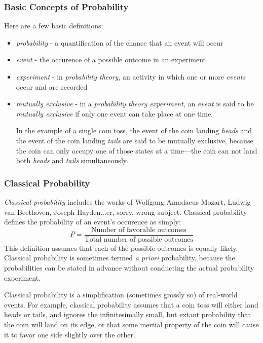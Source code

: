 \documentclass[12pt]{article}
\begin{document}
\subsubsection{Basic Concepts of Probability}
Here are a few basic definitions:
\begin{itemize}
\item \textit{probability} - a quantification of the chance that an event will occur
\item \textit{event} - the occurence of a possible outcome in an experiment
\item \textit{experiment} - in \textit{probability theory}, an activity in which one or more \textit{events} occur and are recorded
\item \textit{mutually exclusive} - in a \textit{probability theory experiment}, an \textit{event} is said to be \textit{mutually exclusive} if only one event can take place at one time. 

In the example of a single coin toss, the event of the coin landing \textit{heads} and the event of the coin landing \textit{tails} are said to be mutually exclusive, because the coin can only  occupy one of those states at a time---the coin can not land both \textit{heads} and \textit{tails} simultaneously.

\end{itemize}

\subsubsection{Classical Probability}
\textit{Classical probability} includes the works of Wolfgang Amadaeus Mozart, Ludwig van Beethoven, Joseph Hayden...er, sorry, wrong subject. Classical probability defines the probability of an event's occurence as simply:
\begin{equation}
P = \frac{\text{Number of favorable outcomes}}{\text{Total number of possible outcomes}}
\end{equation}
This definition assumes that each of the possible outcomes is equally likely. Classical probability is sometimes termed \textit{a priori} probability, because the probabilities can be stated in advance without conducting the actual probability experiment.

Classical probability is a simplification (sometimes grossly so) of real-world events. For example, classical probability assumes that a coin toss will either land heads or tails, and ignores the infinitesimally small, but extant probability that the coin will land on its edge, or that some inertial property of the coin will cause it to favor one side slightly over the other.
\end{document}
